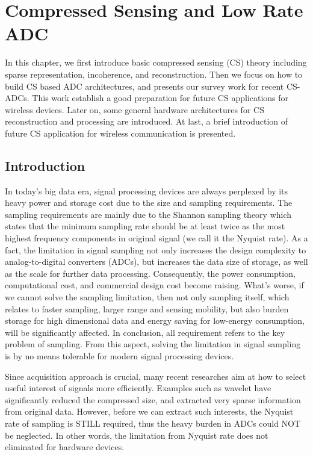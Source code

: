 \chapter{Compressed Sensing and Low Rate ADC}\label{C:compressed_sensing}
\indent \indent In this chapter, we first introduce basic compressed sensing (CS) theory including sparse representation, incoherence, and reconstruction. Then we focus on how to build CS based ADC architectures, and presents our survey work for recent CS-ADCs. This work establish a good preparation for future CS  applications for wireless devices. Later on, some general hardware architectures for CS reconstruction and processing are introduced. At last, a brief introduction of future CS application for wireless communication is presented.

\section{Introduction}
\indent \indent In today's big data era, signal processing devices are always perplexed by its heavy power and storage cost due to the size and sampling requirements. The sampling requirements are mainly due to the Shannon sampling theory which states that the minimum sampling rate should be at least twice as the most highest frequency components in original signal (we call it the Nyquist rate). As a fact, the limitation in signal sampling not only increases the design complexity to analog-to-digital converters (ADCs), but increases the data size of storage, as well as the scale for further data processing. Consequently, the power consumption, computational cost, and commercial design cost become raising. What's worse, if we cannot solve the sampling limitation, then not only sampling itself, which relates to faster sampling, larger range and sensing mobility, but also burden storage for high dimensional data and energy saving for low-energy consumption, will be significantly affected. In conclusion, all requirement refers to the key problem of sampling. From this aspect, solving the limitation in signal sampling is by no means tolerable for modern signal processing devices.

Since acquisition approach is crucial, many recent researches aim at how to select useful interest of signals more efficiently. Examples such as wavelet \cite{chui1992introduction} have significantly reduced the compressed size, and extracted very sparse information from original data. However, before we can extract such interests, the Nyquist rate of sampling is STILL required, thus the heavy burden in ADCs could NOT be neglected. In other words, the limitation from Nyquist rate does not eliminated for hardware devices.  

